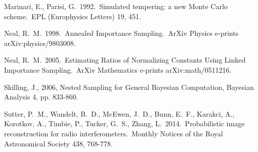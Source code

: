 \documentclass[
  ,final            %
  ]
  {aipproc}
\begin{document}
\begin{thebibliography}{9}
 Marinari, E., 
Parisi, G.\ 1992.\ Simulated tempering: a new Monte Carlo scheme.\ EPL 
(Europhysics Letters) 19, 451. 

 Neal, R.~M.\ 1998.\ Annealed 
Importance Sampling.\ ArXiv Physics e-prints arXiv:physics/9803008. 

 Neal, R.~M.\ 2005.\ Estimating 
Ratios of Normalizing Constants Using Linked Importance Sampling.\ ArXiv 
Mathematics e-prints arXiv:math/0511216. 

 Skilling, J., 2006, Nested Sampling for General Bayesian Computation, Bayesian Analysis 4, pp. 833-860.

 Sutter, P.~M., Wandelt, 
B.~D., McEwen, J.~D., Bunn, E.~F., Karakci, A., Korotkov, A., Timbie, P., 
Tucker, G.~S., Zhang, L.\ 2014.\ Probabilistic image reconstruction for 
radio interferometers.\ Monthly Notices of the Royal Astronomical Society 
438, 768-778. 

\end{thebibliography}
\end{document}
